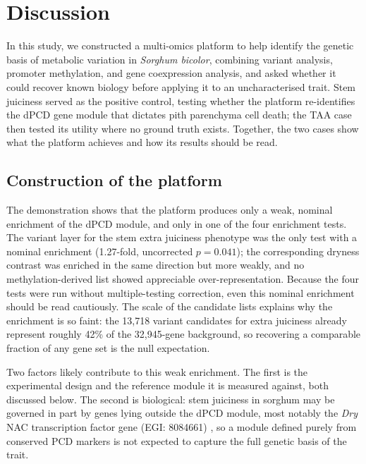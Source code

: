 \chapter{Discussion}

\hspace{1em}In this study, we constructed a multi-omics platform to help identify the genetic basis of metabolic variation in \textit{Sorghum bicolor}, combining variant analysis, promoter methylation, and gene coexpression analysis, and asked whether it could recover known biology before applying it to an uncharacterised trait. Stem juiciness served as the positive control, testing whether the platform re-identifies the dPCD gene module that dictates pith parenchyma cell death; the TAA case then tested its utility where no ground truth exists. Together, the two cases show what the platform achieves and how its results should be read.

\section{Construction of the platform}
\hspace{1em}The demonstration shows that the platform produces only a weak, nominal enrichment of the dPCD module, and only in one of the four enrichment tests. The variant layer for the stem extra juiciness phenotype was the only test with a nominal enrichment (1.27-fold, uncorrected $p = 0.041$); the corresponding dryness contrast was enriched in the same direction but more weakly, and no methylation-derived list showed appreciable over-representation. Because the four tests were run without multiple-testing correction, even this nominal enrichment should be read cautiously. The scale of the candidate lists explains why the enrichment is so faint: the 13,718 variant candidates for extra juiciness already represent roughly 42\% of the 32,945-gene background, so recovering a comparable fraction of any gene set is the null expectation.

\hspace{1em}Two factors likely contribute to this weak enrichment. The first is the experimental design and the reference module it is measured against, both discussed below. The second is biological: stem juiciness in sorghum may be governed in part by genes lying outside the dPCD module, most notably the \textit{Dry} NAC transcription factor gene (EGI: 8084661) \cite{fujimotoTranscriptionalSwitchProgrammed2018}, so a module defined purely from conserved PCD markers is not expected to capture the full genetic basis of the trait.

